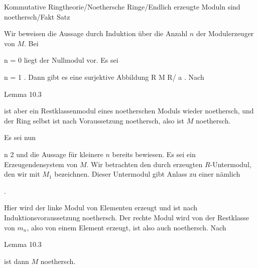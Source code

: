 {Kommutative Ringtheorie/Noethersche Ringe/Endlich erzeugte Moduln sind noethersch/Fakt}
{Satz}
{}
{



\faktsituation {}
\faktzusatz {}
\faktzusatz {}





}
{





Wir beweisen die Aussage durch Induktion über die Anzahl $n$ der Modulerzeuger von $M$. Bei

\mavergleichskette
{\vergleichskette
{ n
}
{ = }{ 0
}
{  }{
}
{    }{
}
{   }{
}
}
{}{}{}
liegt der Nullmodul vor. Es sei

\mavergleichskette
{\vergleichskette
{ n
}
{ = }{ 1
}
{  }{
}
{    }{
}
{   }{
}
}
{}{}{.}
Dann gibt es eine surjektive Abbildung
\maabb {} { R } { M \cong R/ {\mathfrak a}
} {.}
Nach

Lemma 10.3

ist aber ein Restklassenmodul eines noetherschen Moduls wieder noethersch, und der Ring selbst ist nach Voraussetzung noethersch, also ist $M$ noethersch.

Es sei nun

\mavergleichskette
{\vergleichskette
{ n
}
{ \geq }{ 2
}
{  }{
}
{    }{
}
{   }{
}
}
{}{}{}
und die Aussage für kleinere $n$ bereits bewiesen. Es sei
 ein Erzeugendensystem von $M$. Wir betrachten den durch
 erzeugten $R$-Untermodul, den wir mit $M_1$ bezeichnen. Dieser Untermodul gibt Anlass zu einer
nämlich

 { . }

Hier wird der linke Modul von  Elementen erzeugt und ist nach Induktionsvoraussetzung noethersch. Der rechte Modul wird von der Restklasse von $m_n$, also von einem Element erzeugt, ist also auch noethersch. Nach

Lemma 10.3

ist dann $M$ noethersch.




}






